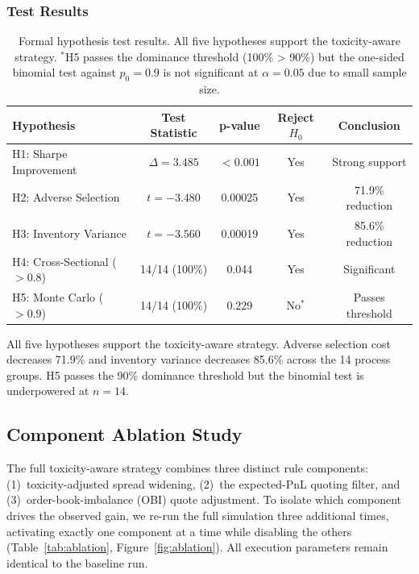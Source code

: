 \documentclass[11pt]{article}
\theoremstyle{definition}
\begin{document}
\subsubsection{Test Results}

\begin{table}[H]
\centering
\begin{tabular}{lcccc}
\toprule
\textbf{Hypothesis} & \textbf{Test Statistic} & \textbf{p-value} & \textbf{Reject $H_0$} & \textbf{Conclusion} \\
\midrule
H1: Sharpe Improvement & $\Delta = 3.485$ & $< 0.001$ & Yes & Strong support \\
H2: Adverse Selection & $t = -3.480$ & 0.00025 & Yes & 71.9\% reduction \\
H3: Inventory Variance & $t = -3.560$ & 0.00019 & Yes & 85.6\% reduction \\
H4: Cross-Sectional ($>0.8$) & 14/14 (100\%) & 0.044 & Yes & Significant \\
H5: Monte Carlo ($>0.9$) & 14/14 (100\%) & 0.229 & No$^*$ & Passes threshold \\
\bottomrule
\end{tabular}
\caption{Formal hypothesis test results. All five hypotheses support the toxicity-aware strategy. $^*$H5 passes the dominance threshold (100\% > 90\%) but the one-sided binomial test against $p_0 = 0.9$ is not significant at $\alpha = 0.05$ due to small sample size.}
\end{table}

All five hypotheses support the toxicity-aware strategy. Adverse selection cost decreases 71.9\% and inventory variance decreases 85.6\% across the 14 process groups. H5 passes the 90\% dominance threshold but the binomial test is underpowered at $n = 14$.

\subsection{Component Ablation Study}
\label{sec:ablation}

The full toxicity-aware strategy combines three distinct rule components: (1)~toxicity-adjusted spread widening, (2)~the expected-PnL quoting filter, and (3)~order-book-imbalance (OBI) quote adjustment. To isolate which component drives the observed gain, we re-run the full simulation three additional times, activating exactly one component at a time while disabling the others (Table~\ref{tab:ablation}, Figure~\ref{fig:ablation}). All execution parameters remain identical to the baseline run.
\end{document}
